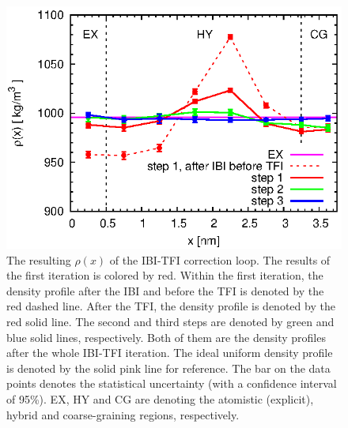 \documentclass[aps,pre,preprint,unsortedaddress]{revtex4}
\begin{document}
\begin{figure}
  \centering
  \includegraphics{fig/rho.eps}
  \caption{The resulting $\rho(x)$ of the IBI-TFI correction loop.
    The results of the first iteration is colored by red. Within the
    first iteration, the density profile after the IBI and before the
    TFI is denoted by the  red dashed line.  After the TFI, the density
    profile is denoted by the  red solid line.  The second and third
    steps are denoted by green and blue solid lines,
    respectively. Both of them are the density profiles after the
    whole IBI-TFI iteration. The ideal uniform density profile is
    denoted by the solid pink line for reference. The bar on the data
    points denotes the statistical uncertainty (with a confidence
    interval of 95\%). EX, HY and CG are denoting the atomistic
    (explicit), hybrid and coarse-graining regions, respectively. }
  \label{fig:tmp3}
\end{figure}
\end{document}
